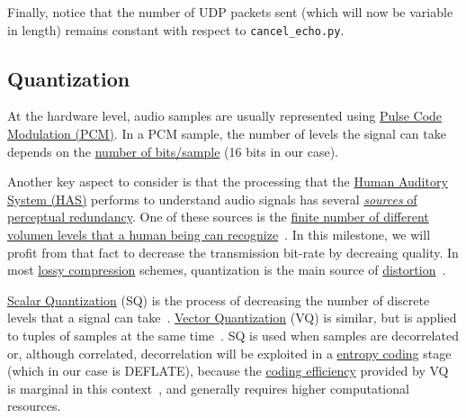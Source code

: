 Finally, notice that the number of UDP packets sent (which will now be
variable in length) remains constant with respect to
\verb|cancel_echo.py|.

\subsection{Quantization}
At the hardware level, audio samples are usually represented
using \href{https://en.wikipedia.org/wiki/Pulse-code_modulation}{Pulse
  Code Modulation (PCM)}. In a PCM sample, the number of levels
the signal can take depends on the
\href{https://en.wikipedia.org/wiki/Audio_bit_depth}{number of
  bits/sample} (16 bits in our case).

Another key aspect to consider is that the processing that the
\href{https://en.wikipedia.org/wiki/Auditory_system}{Human
  Auditory System (HAS)} performs to understand audio signals has several
\href{https://en.wikipedia.org/wiki/Psychoacoustics}{\emph{sources} of
  perceptual redundancy}. One of these sources is the
\href{https://en.wikipedia.org/wiki/Equal-loudness_contour}{finite
  number of different volumen levels that a human being can
  recognize}~\cite{bosi2003intro}. In this milestone, we will profit from
that fact to decrease the transmission bit-rate by decreaing
quality. In most
\href{https://en.wikipedia.org/wiki/Lossy_compression}{lossy
  compression} schemes, quantization is the main source of
\href{https://en.wikipedia.org/wiki/Distortion}{distortion}~\cite{taubman2002jpeg2000}.

\href{https://en.wikipedia.org/wiki/Quantization_(signal_processing)}{Scalar
  Quantization} (SQ) is the process of decreasing the number of
discrete levels that a signal can
take~\cite{sayood2017introduction}. \href{https://en.wikipedia.org/wiki/Vector_quantization}{Vector
  Quantization} (VQ) is similar, but is applied to tuples of samples
at the same time~\cite{vetterli2014foundations}. SQ is used when
samples are decorrelated or, although correlated,
decorrelation will be exploited in a
\href{https://en.wikipedia.org/wiki/Entropy_encoding}{entropy coding}
stage (which in our case is DEFLATE), because the
\href{https://en.wikipedia.org/wiki/Quantization_(signal_processing)#Rate%E2%80%93distortion_optimization}{coding
  efficiency} provided by VQ is marginal in this
context~\cite{vetterli2014foundations}, and generally requires higher
computational resources.


